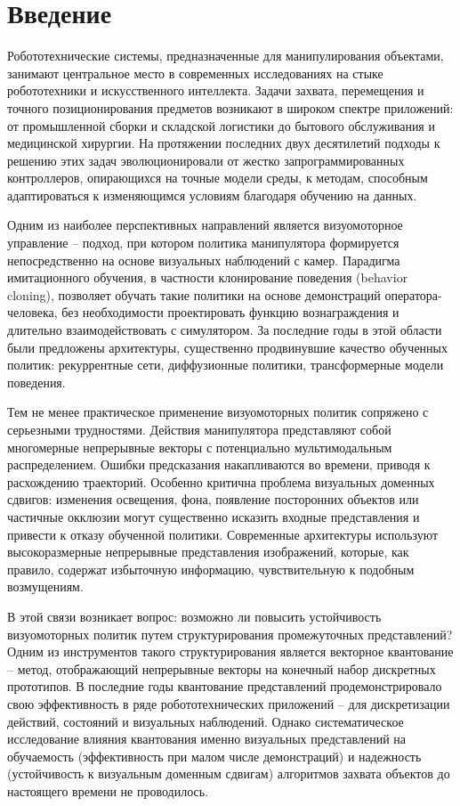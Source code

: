 \chapter*{Введение}
\label{ch:intro}

Робототехнические системы, предназначенные для манипулирования объектами, занимают центральное место в современных исследованиях на стыке робототехники и искусственного интеллекта. Задачи захвата, перемещения и точного позиционирования предметов возникают в широком спектре приложений: от промышленной сборки и складской логистики до бытового обслуживания и медицинской хирургии. На протяжении последних двух десятилетий подходы к решению этих задач эволюционировали от жестко запрограммированных контроллеров, опирающихся на точные модели среды, к методам, способным адаптироваться к изменяющимся условиям благодаря обучению на данных.

Одним из наиболее перспективных направлений является визуомоторное управление -- подход, при котором политика манипулятора формируется непосредственно на основе визуальных наблюдений с камер. Парадигма имитационного обучения, в частности клонирование поведения (behavior cloning), позволяет обучать такие политики на основе демонстраций оператора-человека, без необходимости проектировать функцию вознаграждения и длительно взаимодействовать с симулятором. За последние годы в этой области были предложены архитектуры, существенно продвинувшие качество обученных политик: рекуррентные сети, диффузионные политики, трансформерные модели поведения.

Тем не менее практическое применение визуомоторных политик сопряжено с серьезными трудностями. Действия манипулятора представляют собой многомерные непрерывные векторы с потенциально мультимодальным распределением. Ошибки предсказания накапливаются во времени, приводя к расхождению траекторий. Особенно критична проблема визуальных доменных сдвигов: изменения освещения, фона, появление посторонних объектов или частичные окклюзии могут существенно исказить входные представления и привести к отказу обученной политики. Современные архитектуры используют высокоразмерные непрерывные представления изображений, которые, как правило, содержат избыточную информацию, чувствительную к подобным возмущениям.

В этой связи возникает вопрос: возможно ли повысить устойчивость визуомоторных политик путем структурирования промежуточных представлений? Одним из инструментов такого структурирования является векторное квантование -- метод, отображающий непрерывные векторы на конечный набор дискретных прототипов. В последние годы квантование представлений продемонстрировало свою эффективность в ряде робототехнических приложений -- для дискретизации действий, состояний и визуальных наблюдений. Однако систематическое исследование влияния квантования именно визуальных представлений на обучаемость (эффективность при малом числе демонстраций) и надежность (устойчивость к визуальным доменным сдвигам) алгоритмов захвата объектов до настоящего времени не проводилось.

